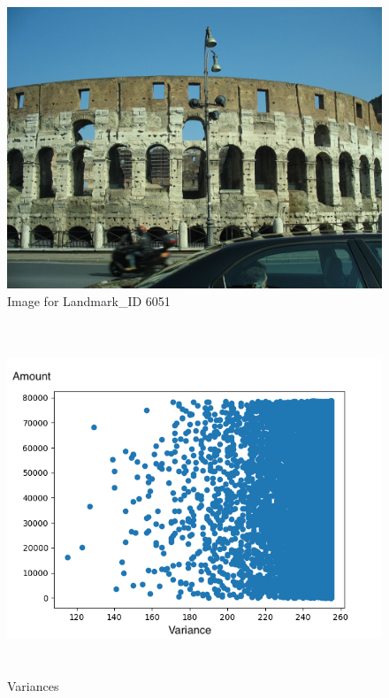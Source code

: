 \begin{figure}
	\includegraphics[width=\textwidth]{images/6051}
	\caption{Image for Landmark\_ID 6051}
	\label{6051}
\end{figure}

\begin{figure}
	\includegraphics[width=\textwidth, height=10.5cm]{images/variances}
	\caption{Variances}
	\label{variances}
\end{figure}

